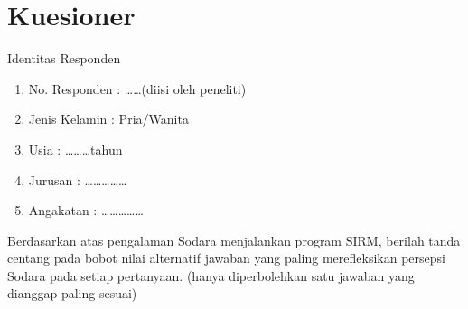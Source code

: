 \chapter{Kuesioner}
\label{kuesioner}

Identitas Responden
\begin{enumerate}[1]
  \item No. Responden	: \ldots\ldots (diisi oleh peneliti)
  \item Jenis Kelamin	: Pria/Wanita
  \item Usia			: \ldots\ldots\ldots tahun
  \item Jurusan			: \ldots\ldots\ldots\ldots\ldots
  \item Angakatan		: \ldots\ldots\ldots\ldots\ldots
\end{enumerate}
Berdasarkan atas pengalaman Sodara menjalankan program SIRM, berilah tanda
centang pada bobot nilai alternatif jawaban yang paling merefleksikan persepsi
Sodara pada setiap pertanyaan. (hanya diperbolehkan satu jawaban yang dianggap
paling sesuai)

